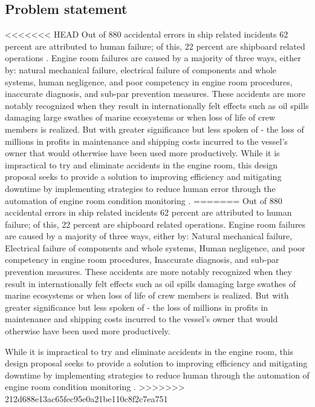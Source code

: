 \subsection{Problem  statement}
<<<<<<< HEAD
 Out of 880 accidental errors in ship related incidents 62 percent are attributed to human failure; of this, 22 percent are shipboard related operations \cite{bratic_review_2019}. Engine room failures are caused by a majority of three ways, either by: natural mechanical failure, electrical failure of components and whole systems, human negligence, and poor competency in engine room procedures, inaccurate diagnosis, and sub-par prevention measures. These accidents are more notably recognized when they result in internationally felt effects such as oil spills damaging large swathes of marine ecosystems or when loss of life of crew members is realized. But with greater significance but less spoken of - the loss of millions in profits in maintenance and shipping costs incurred to the vessel’s owner that would otherwise have been used more productively. While it is impractical to try and eliminate accidents in the engine room, this design proposal seeks to provide a solution to improving efficiency and mitigating downtime by implementing strategies to reduce human error through the automation of engine room condition monitoring \cite{noauthor_13_nodate}. 
=======
 Out of 880 accidental errors in ship related incidents 62 percent are attributed to human failure; of this, 22 percent are shipboard related operations. Engine room failures are caused by a majority of three ways, either by: Natural mechanical failure, Electrical failure of components and whole systems, Human negligence, and poor competency in engine room procedures, Inaccurate diagnosis, and sub-par prevention measures. These accidents are more notably recognized when they result in internationally felt effects such as oil spills damaging large swathes of marine ecosystems or when loss of life of crew members is realized. But with greater significance but less spoken of - the loss of millions in profits in maintenance and shipping costs incurred to the vessel’s owner that would otherwise have been used more productively.
 
  While it is impractical to try and eliminate accidents in the engine room, this design proposal seeks to provide a solution to improving efficiency and mitigating downtime by implementing strategies to reduce human through the automation of engine room condition monitoring \cite{noauthor_13_nodate}. 
>>>>>>> 212d688e13ac65fec95e0a21be110c8f2c7ea751


